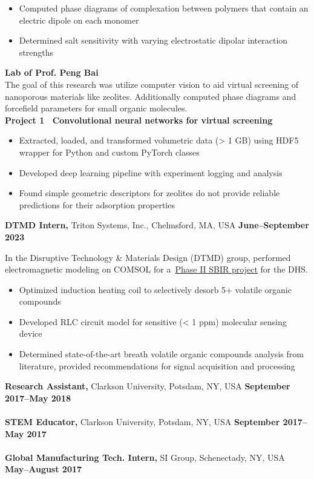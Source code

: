 \documentclass[margin,line]{res}
\begin{document}
\begin{resume}
\begin{adjustwidth}{1.5em}{0pt}
\begin{itemize}
			\item Computed phase diagrams of complexation between polymers that
			      contain an electric dipole on each monomer
			\item Determined salt sensitivity with varying electrostatic dipolar
			      interaction strengths
		\end{itemize}
	\end{adjustwidth}
	\begin{adjustwidth}{1.5em}{0pt}
		{\bf Lab of Prof. Peng Bai}\\
		The goal of this research was utilize computer vision to aid virtual
		screening of nanoporous materials like zeolites. Additionally computed
		phase diagrams and forcefield parameters for small organic molecules.
		\\
		{\bf Project 1~\textendash{} Convolutional neural networks for virtual
		screening}
		\begin{itemize}
			\item Extracted, loaded, and transformed volumetric data (> 1 GB) using
			      HDF5 wrapper for Python and custom PyTorch classes
			\item Developed deep learning pipeline with experiment logging and
			      analysis
			\item Found simple geometric descriptors for zeolites do not provide
			      reliable predictions for their adsorption properties
		\end{itemize}
	\end{adjustwidth}
	{\bf DTMD Intern,} Triton Systems, Inc., Chelmsford, MA, USA
	\hfill {\bf June--September 2023}
	\begin{adjustwidth}{1.5em}{0pt}
		In the Disruptive Technology \& Materials Design (DTMD) group, performed
		electromagnetic modeling on COMSOL for
		a~\href{https://legacy.www.sbir.gov/sbirsearch/detail/2234557}{Phase II
			SBIR project} for the DHS.
		\begin{itemize}
			\item Optimized induction heating coil to selectively desorb 5+ volatile
			      organic compounds
			\item Developed RLC circuit model for sensitive (< 1 ppm) molecular sensing
			      device
			\item Determined state-of-the-art breath volatile organic compounds
			      analysis from literature, provided recommendations for signal
			      acquisition and processing
		\end{itemize}
	\end{adjustwidth}
	{\bf Research Assistant,} Clarkson University, Potsdam, NY, USA
	\hfill {\bf September 2017--May 2018}\\
	\\
	{\bf STEM Educator,} Clarkson University, Potsdam, NY, USA
	\hfill {\bf September 2017--May 2017}\\
	\\
	{\bf Global Manufacturing Tech. Intern,} SI Group, Schenectady, NY, USA
	\hfill {\bf  May--August 2017}\\


\end{resume}
\end{document}
